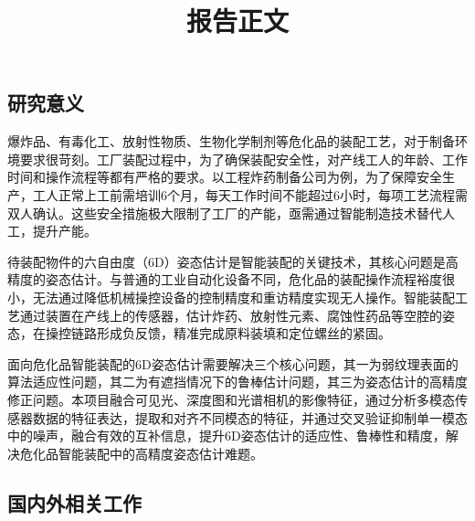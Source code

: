 \documentclass[12pt]{article}
\begin{document}

\title{报告正文}
\maketitle
\thispagestyle{empty}




\subsection{研究意义}

爆炸品、有毒化工、放射性物质、生物化学制剂等危化品的装配工艺，对于制备环境要求很苛刻。工厂装配过程中，为了确保装配安全性，对产线工人的年龄、工作时间和操作流程等都有严格的要求。以工程炸药制备公司为例，为了保障安全生产，工人正常上工前需培训6个月，每天工作时间不能超过6小时，每项工艺流程需双人确认。这些安全措施极大限制了工厂的产能，亟需通过智能制造技术替代人工，提升产能。

待装配物件的六自由度（6D）姿态估计是智能装配的关键技术，其核心问题是高精度的姿态估计。与普通的工业自动化设备不同，危化品的装配操作流程裕度很小，无法通过降低机械操控设备的控制精度和重访精度实现无人操作。智能装配工艺通过装置在产线上的传感器，估计炸药、放射性元素、腐蚀性药品等空腔的姿态，在操控链路形成负反馈，精准完成原料装填和定位螺丝的紧固。

面向危化品智能装配的6D姿态估计需要解决三个核心问题，其一为弱纹理表面的算法适应性问题，其二为有遮挡情况下的鲁棒估计问题，其三为姿态估计的高精度修正问题。本项目融合可见光、深度图和光谱相机的影像特征，通过分析多模态传感器数据的特征表达，提取和对齐不同模态的特征，并通过交叉验证抑制单一模态中的噪声，融合有效的互补信息，提升6D姿态估计的适应性、鲁棒性和精度，解决危化品智能装配中的高精度姿态估计难题。

\subsection{国内外相关工作}
\end{document}
